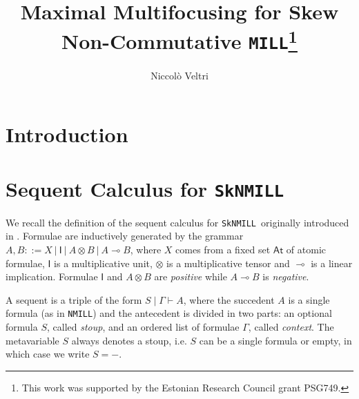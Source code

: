 \documentclass[runningheads]{llncs}
\newcommand{\ot}{\otimes}
\newcommand{\lolli}{\multimap}
\newcommand{\I}{\mathsf{I}}
\newcommand{\MILL}{\texttt{MILL}}
\newcommand{\NMILL}{\texttt{NMILL}}
\newcommand{\SkNMILL}{\texttt{SkNMILL}}
\newcommand{\At}{\mathsf{At}}
\begin{document}
\title{Maximal Multifocusing for Skew Non-Commutative \MILL\thanks{This work was supported by the Estonian Research Council grant PSG749.}}

\author{Niccol{\`o} Veltri}
%
%
\maketitle
%
\begin{abstract}

\keywords{}  
\end{abstract}

\section{Introduction}\label{sec:intro}

\section{Sequent Calculus for \SkNMILL}\label{sec:seqcalc}

We recall the definition of the sequent calculus for \SkNMILL\ originally introduced in \cite{UVW:protsn}.
Formulae are inductively generated by the grammar $A,B ::= X \ | \ \I \ | \ A \ot B \ | \ A \lolli B$, where $X$ comes from a fixed set $\At$ of atomic formulae, $\I$ is a multiplicative unit, $\ot$ is a multiplicative tensor and $\lolli$ is a linear implication. Formulae $\I$ and $A \ot B$ are \emph{positive} while $A \lolli B$ is \emph{negative}. 

A sequent is a triple of the form $S \mid \Gamma \vdash A$, where the succedent $A$ is a single formula (as in \NMILL) and the antecedent is divided in two parts: an optional formula $S$, called \emph{stoup}, and an ordered list of formulae $\Gamma$, called \emph{context}. 
The metavariable $S$ always denotes a stoup, i.e. $S$ can be a single formula or empty, in which case we write $S = -$.
\end{document}
